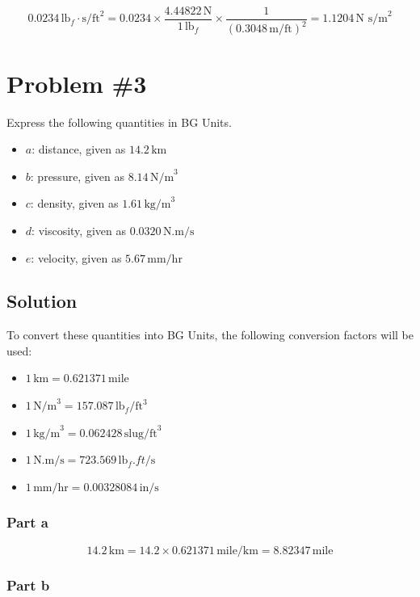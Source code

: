 \documentclass{article}
\begin{document}
\[
0.0234 \, \text{lb}_f \cdot \text{s/ft}^2 = 0.0234 \times \frac{4.44822 \, \text{N}}{1 \, \text{lb}_f} \times \frac{1}{(0.3048 \, \text{m/ft})^2} = 1.1204 \, \text{N s/m}^2
\]
\newpage %

\section*{Problem \#3}
Express the following quantities in BG Units.

\begin{itemize}
    \item \( a \): distance, given as \(14.2 \, \text{km}\)
    \item \( b \): pressure, given as \(8.14 \, \text{N/m}^3\)
    \item \( c \): density, given as \(1.61 \, \text{kg/m}^3\)
    \item \( d \): viscosity, given as \(0.0320 \, \text{N.m/s}\)
    \item \( e \): velocity, given as \(5.67 \, \text{mm/hr}\)
\end{itemize}

\subsection*{Solution}

To convert these quantities into BG Units, the following conversion factors will be used:

\begin{itemize}
    \item \( 1 \, \text{km} = 0.621371 \, \text{mile} \)
    \item \( 1 \, \text{N/m}^3 = 157.087 \, \text{lb}_f/\text{ft}^3 \)
    \item \( 1 \, \text{kg/m}^3 = 0.062428 \, \text{slug/ft}^3 \)
    \item \( 1 \, \text{N.m/s} = 723.569 \, \text{lb}_f.ft/\text{s} \)
    \item \( 1 \, \text{mm/hr} = 0.00328084 \, \text{in/s} \)
\end{itemize}

\subsubsection*{Part a}

\[
14.2 \, \text{km} = 14.2 \times 0.621371 \, \text{mile/km} = 8.82347 \, \text{mile}
\]

\subsubsection*{Part b}
\end{document}
